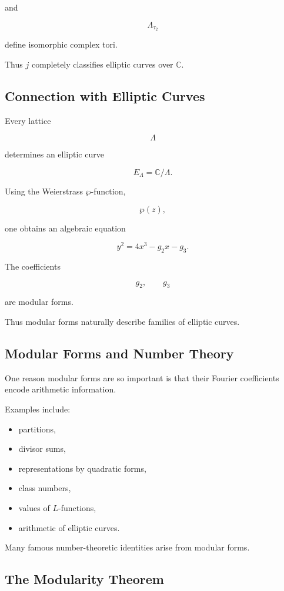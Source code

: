 \documentclass[12pt,a4paper]{article}
\theoremstyle{notespace}
\begin{document}
and

\[
\Lambda_{\tau_2}
\]

define isomorphic complex tori.

Thus \(j\) completely classifies elliptic curves over \(\mathbb C\).

\subsection{Connection with Elliptic Curves}

Every lattice

\[
\Lambda
\]

determines an elliptic curve

\[
E_\Lambda
=
\mathbb C/\Lambda.
\]

Using the Weierstrass \(\wp\)-function,

\[
\wp(z),
\]

one obtains an algebraic equation

\[
y^2
=
4x^3
-
g_2x
-
g_3.
\]

The coefficients

\[
g_2,
\qquad
g_3
\]

are modular forms.

Thus modular forms naturally describe families of elliptic curves.

\subsection{Modular Forms and Number Theory}

One reason modular forms are so important is that their Fourier coefficients encode arithmetic information.

Examples include:

\begin{itemize}
	\item partitions,
	\item divisor sums,
	\item representations by quadratic forms,
	\item class numbers,
	\item values of \(L\)-functions,
	\item arithmetic of elliptic curves.
\end{itemize}

Many famous number-theoretic identities arise from modular forms.

\subsection{The Modularity Theorem}
\end{document}
